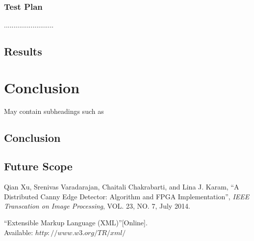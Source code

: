 \documentclass[11pt]{report}
\begin{document}
\subsection{Test Plan}
..........................


\section{Results}


\chapter{Conclusion}
\label {con}

May contain subheadings such as 

\section{Conclusion}
\section{Future Scope}


\begin{thebibliography}{}


 Qian Xu, Srenivas Varadarajan, Chaitali Chakrabarti, and Lina J. Karam, \textquotedblleft A Distributed Canny Edge Detector: Algorithm and FPGA Implementation\textquotedblright , \textit{IEEE Transcation on Image Processing}, VOL. 23, NO. 7, July 2014.

 \textquotedblleft Extensible Markup Language (XML)\textquotedblright [Online].\\
Available: $http://www.w3.org/TR/xml/$


\end{thebibliography}
\end{document}
